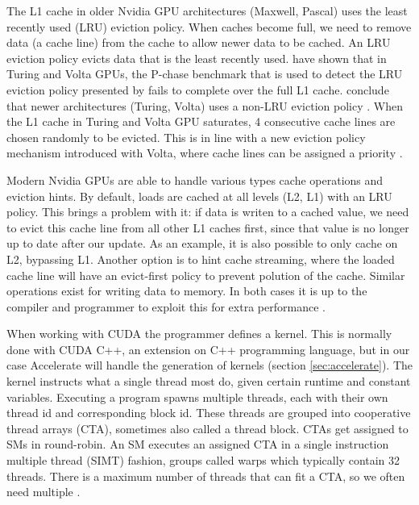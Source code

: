 \documentclass{article}
\begin{document}
The L1 cache in older Nvidia GPU architectures (Maxwell, Pascal) uses the least recently used (LRU) eviction policy.
When caches become full, we need to remove data (a cache line) from the cache to allow newer data to be cached.
An LRU eviction policy evicts data that is the least recently used.
\citet{jia2019dissecting} have shown that in Turing and Volta GPUs, the P-chase benchmark that is used to detect the LRU eviction policy presented by \citet{mei2016dissecting} fails to complete over the full L1 cache.
\citeauthor{jia2019dissecting} conclude that newer architectures (Turing, Volta) uses a non-LRU eviction policy \cite{jia2019dissecting, jia2018dissecting,mei2016dissecting}.
When the L1 cache in Turing and Volta GPU saturates, 4 consecutive cache lines are chosen randomly to be evicted.
This is in line with a new eviction policy mechanism introduced with Volta, where cache lines can be assigned a priority \cite{jia2019dissecting,nvidia2021cudadocs}.

Modern Nvidia GPUs are able to handle various types cache operations and eviction hints.
By default, loads are cached at all levels (L2, L1) with an LRU policy.
This brings a problem with it: if data is writen to a cached value, we need to evict this cache line from all other L1 caches first, since that value is no longer up to date after our update.
As an example, it is also possible to only cache on L2, bypassing L1.
Another option is to hint cache streaming, where the loaded cache line will have an evict-first policy to prevent polution of the cache.
Similar operations exist for writing data to memory.
In both cases it is up to the compiler and programmer to exploit this for extra performance \cite{nvidia2021cudadocs}.

When working with CUDA the programmer defines a kernel.
This is normally done with CUDA C++, an extension on C++ programming language, but in our case Accelerate will handle the generation of kernels (section \ref{sec:accelerate}).
The kernel instructs what a single thread most do, given certain runtime and constant variables.
Executing a program spawns multiple threads, each with their own thread id and corresponding block id.
These threads are grouped into cooperative thread arrays (CTA), sometimes also called a thread block.
CTAs get assigned to SMs in round-robin.
An SM executes an assigned CTA in a single instruction multiple thread (SIMT) fashion, groups called warps which typically contain 32 threads.
There is a maximum number of threads that can fit a CTA, so we often need multiple \cite{nvidia2021cudadocs}.
\end{document}
